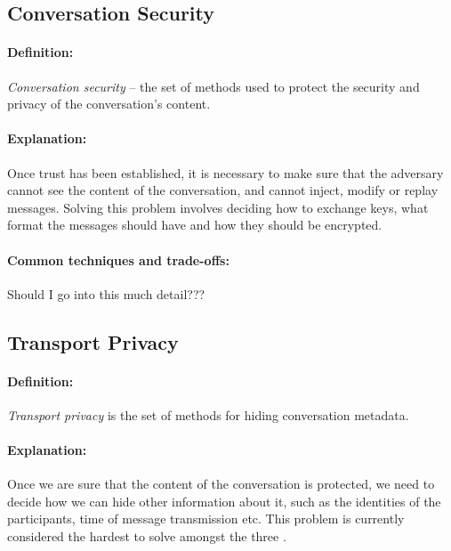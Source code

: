 \documentclass[a4paper, 12pt]{report}
\begin{document}
\subsection{Conversation Security}
\label{ssec:convsec}
\paragraph{Definition:} \hspace{-8pt}
\textit{Conversation security} -- the set of methods used to protect the security and privacy of the conversation's content.

\paragraph{Explanation:} \hspace{-8pt}
Once trust has been established, it is necessary to make sure that the adversary cannot see the content of the conversation, and cannot inject, modify or replay messages. Solving this problem involves deciding how to exchange keys, what format the messages should have and how they should be encrypted.

\paragraph{Common techniques and trade-offs:} \hspace{-8pt}
{\color{red}
Should I go into this much detail???}





\subsection{Transport Privacy}
\paragraph{Definition:} \hspace{-8pt}
\textit{Transport privacy} is the set of methods for hiding conversation metadata.

\paragraph{Explanation:} \hspace{-8pt}
Once we are sure that the content of the conversation is protected, we need to decide how we can hide other information about it, such as the identities of the participants, time of message transmission etc. This problem is currently considered the hardest to solve amongst the three \cite{unger2015sok}.
\end{document}

